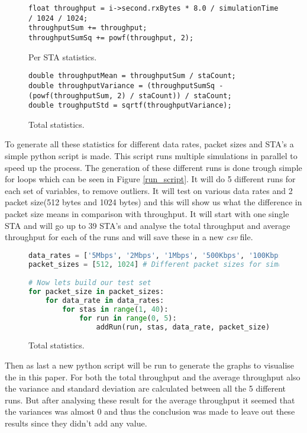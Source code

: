 \documentclass[]{article}
\begin{document}
\begin{figure}[H]
\begin{lstlisting}[frame=bt]
float throughput = i->second.rxBytes * 8.0 / simulationTime / 1024 / 1024;
throughputSum += throughput;
throughputSumSq += powf(throughput, 2);
\end{lstlisting}
\caption{Per STA statistics.\label{fig:sta_stats}}
\end{figure}

\begin{figure}[H]
\begin{lstlisting}[frame=bt]
double throughputMean = throughputSum / staCount;
double throughputVariance = (throughputSumSq - (powf(throughputSum, 2) / staCount)) / staCount;
double troughputStd = sqrtf(throughputVariance);
\end{lstlisting}
\caption{Total statistics.\label{fig:tot_stats}}
\end{figure}

To generate all these statistics for different data rates, packet sizes and STA's a simple python script is made.
This script runs multiple simulations in parallel to speed up the process.
The generation of these different runs is done trough simple for loops which can be seen in Figure \ref{run_script}.
It will do 5 different runs for each set of variables, to remove outliers.
It will test on various data rates and 2 packet size(512 bytes and 1024 bytes) and this will show us what the difference in packet size means in comparison with throughput.
It will start with one single STA and will go up to 39 STA's and analyse the total throughput and average throughput for each of the runs and will save these in a new \textit{csv} file.

\begin{figure}[H]
\begin{lstlisting}[frame=bt, language=Python]
data_rates = ['5Mbps', '2Mbps', '1Mbps', '500Kbps', '100Kbps']	# Different data rates for simulation
packet_sizes = [512, 1024] # Different packet sizes for simulation

# Now lets build our test set
for packet_size in packet_sizes:
	for data_rate in data_rates:
		for stas in range(1, 40):
			for run in range(0, 5):
				addRun(run, stas, data_rate, packet_size)
\end{lstlisting}
\caption{Total statistics.\label{fig:run_script}}
\end{figure}

Then as last a new python script will be run to generate the graphs to visualise the in this paper.
For both the total throughput and the average throughput also the variance and standard deviation are calculated between all the 5 different runs.
But after analysing these result for the average throughput it seemed that the variances was almost 0 and thus the conclusion was made to leave out these results since they didn't add any value.
\end{document}
